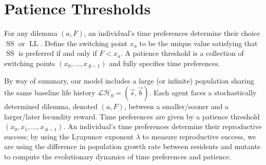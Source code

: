 \documentclass[titlepage, hidelinks, 12pt]{article}
\theoremstyle{plain}
\theoremstyle{remark}
\theoremstyle{definition}
\newcommand{\LH}{\mathcal{LH}}
\DeclareMathOperator{\smallersooner}{SS}
\DeclareMathOperator{\largerlater}{LL}
\begin{document}
\appendix

\section{Patience Thresholds}
For any dilemma $(a,F)$, an individual's time preferences determine their choice $\smallersooner$ or $\largerlater$. 
Define the switching point $x_a$ to be the unique value satisfying that $\smallersooner$ is preferred
if and only if $F < x_a$. 
A patience threshold is a collection of switching points $(x_0, \ldots, x_{A-1})$ and fully specifies time preferences. 

%
%

By way of summary, our model includes a large (or infinite) population sharing the same baseline life history $\LH_0 = (\vec{s}, \vec{b}).$ 
Each agent faces a stochastically determined dilemma, denoted $(a, F)$, between a smaller/sooner and a larger/later fecundity reward. 
Time preferences are given by a patience threshold $(x_0, x_1, \ldots, x_{A-1})$. 
An individual's time preferences determine their reproductive success; by using the Lyapunov exponent $\lambda$ to measure reproductive 
success, we are using the difference in population growth rate between residents and mutants to compute the evolutionary dynamics of time
preferences and patience. 
\end{document}
